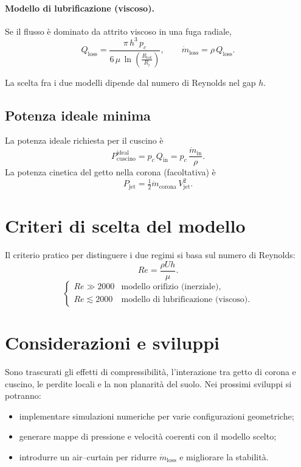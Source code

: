 \documentclass[11pt,a4paper]{article}
\begin{document}
\paragraph{Modello di lubrificazione (viscoso).}
Se il flusso è dominato da attrito viscoso in una fuga radiale,
\begin{equation}
  Q_{\mathrm{loss}} = \frac{\pi\, h^3\, p_c}{6\,\mu\, \ln\!\left(\tfrac{R_{\mathrm{tot}}}{R_i}\right)}, 
  \qquad
  \dot{m}_{\mathrm{loss}} = \rho\, Q_{\mathrm{loss}}.
\end{equation}

La scelta fra i due modelli dipende dal numero di Reynolds nel gap \(h\).

\subsection{Potenza ideale minima}
La potenza ideale richiesta per il cuscino è
\begin{equation}
  P_{\mathrm{cuscino}}^{\mathrm{ideal}} = p_c\, Q_{\mathrm{in}} = p_c\, \frac{\dot{m}_{\mathrm{in}}}{\rho}.
\end{equation}
La potenza cinetica del getto nella corona (facoltativa) è
\begin{equation}
  P_{\mathrm{jet}} = \tfrac12 \dot{m}_{\mathrm{corona}}\, V_{\mathrm{jet}}^2.
\end{equation}

\section{Criteri di scelta del modello}
Il criterio pratico per distinguere i due regimi si basa sul numero di Reynolds:
\begin{equation}
  Re = \frac{\rho U h}{\mu}.
\end{equation}
\[
\begin{cases}
Re \gg 2000 & \text{modello orifizio (inerziale)},\\
Re \lesssim 2000 & \text{modello di lubrificazione (viscoso)}.
\end{cases}
\]

\section{Considerazioni e sviluppi}
Sono trascurati gli effetti di compressibilità, l'interazione tra getto di corona e cuscino, le perdite locali e la non planarità del suolo.
Nei prossimi sviluppi si potranno:
\begin{itemize}
  \item implementare simulazioni numeriche per varie configurazioni geometriche;
  \item generare mappe di pressione e velocità coerenti con il modello scelto;
  \item introdurre un air--curtain per ridurre \(\dot{m}_{\mathrm{loss}}\) e migliorare la stabilità.
\end{itemize}

\nocite{*}


\end{document}
